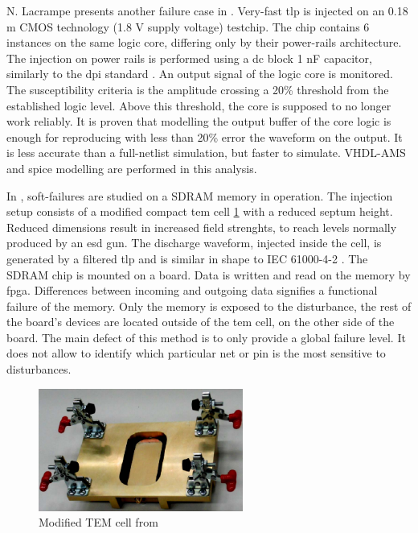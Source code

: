 N. Lacrampe presents another failure case in \cite{LacrampeTransientImmunity}.
Very-fast \gls{tlp} is injected on an 0.18 \textmu{}m CMOS technology (1.8 V supply voltage) testchip.
The chip contains 6 instances on the same logic core, differing only by their power-rails architecture.
The injection on power rails is performed using a \gls{dc} block 1 nF capacitor, similarly to the \gls{dpi} standard \cite{iec62132-4}.
An output signal of the logic core is monitored.
The susceptibility criteria is the amplitude crossing a 20\% threshold from the established logic level.
Above this threshold, the core is supposed to no longer work reliably.
It is proven that modelling the output buffer of the core logic is enough for reproducing with less than 20\% error the waveform on the output.
It is less accurate than a full-netlist simulation, but faster to simulate.
VHDL-AMS and \gls{spice} modelling are performed in this analysis.

In \cite{SDRAMCase}, soft-failures are studied on a SDRAM memory in operation.
The injection setup consists of a modified compact \gls{tem} cell \ref{fig:modified-tem-cell} with a reduced septum height.
Reduced dimensions result in increased field strenghts, to reach levels normally produced by an \gls{esd} gun.
The discharge waveform, injected inside the cell, is generated by a filtered \gls{tlp} and is similar in shape to IEC 61000-4-2 \cite{iec61000-4-2}.
The SDRAM chip is mounted on a board.
Data is written and read on the memory by \gls{fpga}.
Differences between incoming and outgoing data signifies a functional failure of the memory.
Only the memory is exposed to the disturbance, the rest of the board's devices are located outside of the \gls{tem} cell, on the other side of the board.
The main defect of this method is to only provide a global failure level.
It does not allow to identify which particular net or pin is the most sensitive to disturbances.

\begin{figure}[!h]
  \centering
  \includegraphics[width=0.6\textwidth]{src/1/figures/modified_tem_cell.png}
  \caption{Modified TEM cell from \cite{SDRAMCase}}
  \label{fig:modified-tem-cell}
\end{figure}

